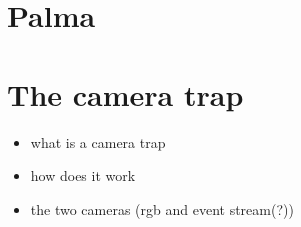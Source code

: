 \section{Palma}
		

\section{The camera trap}

\begin{itemize}
	\item what is a camera trap
	\item how does it work
	\item the two cameras (rgb and event stream(?))
\end{itemize}
